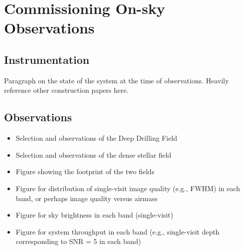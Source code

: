 \section{Commissioning On-sky Observations}

\subsection{Instrumentation}

Paragraph on the state of the system at the time of observations.
Heavily reference other construction papers here.

\subsection{Observations}

\begin{itemize}

\item Selection and observations of the Deep Drilling Field

\item Selection and observations of the dense stellar field

\item Figure showing the footprint of the two fields

\item Figure for distribution of single-visit image quality (e.g., FWHM) in each band, or perhaps image quality versus airmass

\item Figure for sky brightness in each band (single-visit) 

\item Figure for system throughput in each band (e.g., single-visit depth corresponding to SNR = 5 in each band)

\end{itemize}





